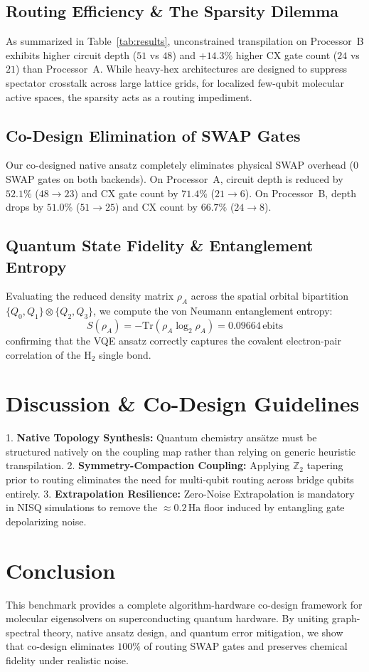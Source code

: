 \documentclass[journal,twocolumn]{article}
\begin{document}
\subsection{Routing Efficiency \& The Sparsity Dilemma}
As summarized in Table~\ref{tab:results}, unconstrained transpilation on Processor~B exhibits higher circuit depth ($51$ vs $48$) and $+14.3\%$ higher CX gate count ($24$ vs $21$) than Processor~A. While heavy-hex architectures are designed to suppress spectator crosstalk across large lattice grids, for localized few-qubit molecular active spaces, the sparsity acts as a routing impediment.

\subsection{Co-Design Elimination of SWAP Gates}
Our co-designed native ansatz completely eliminates physical SWAP overhead ($0$ SWAP gates on both backends). On Processor~A, circuit depth is reduced by $52.1\%$ ($48 \to 23$) and CX gate count by $71.4\%$ ($21 \to 6$). On Processor~B, depth drops by $51.0\%$ ($51 \to 25$) and CX count by $66.7\%$ ($24 \to 8$).

\subsection{Quantum State Fidelity \& Entanglement Entropy}
Evaluating the reduced density matrix $\rho_A$ across the spatial orbital bipartition $\{Q_0, Q_1\} \otimes \{Q_2, Q_3\}$, we compute the von Neumann entanglement entropy:
\begin{equation}
S(\rho_A) = -\text{Tr}(\rho_A \log_2 \rho_A) = 0.09664\,\text{ebits}
\end{equation}
confirming that the VQE ansatz correctly captures the covalent electron-pair correlation of the $\mathrm{H}_2$ single bond.

\section{Discussion \& Co-Design Guidelines}
1. \textbf{Native Topology Synthesis:} Quantum chemistry ansätze must be structured natively on the coupling map rather than relying on generic heuristic transpilation.
2. \textbf{Symmetry-Compaction Coupling:} Applying $\mathbb{Z}_2$ tapering prior to routing eliminates the need for multi-qubit routing across bridge qubits entirely.
3. \textbf{Extrapolation Resilience:} Zero-Noise Extrapolation is mandatory in NISQ simulations to remove the $\approx 0.2\,\text{Ha}$ floor induced by entangling gate depolarizing noise.

\section{Conclusion}
This benchmark provides a complete algorithm-hardware co-design framework for molecular eigensolvers on superconducting quantum hardware. By uniting graph-spectral theory, native ansatz design, and quantum error mitigation, we show that co-design eliminates $100\%$ of routing SWAP gates and preserves chemical fidelity under realistic noise.



\end{document}
